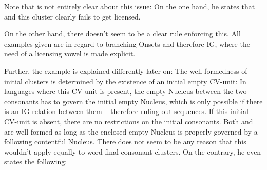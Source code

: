 \ti{*[Sa:kf]}
\begin{structure}
  \wordstart
  \emptyV
  \fen
\end{structure}

Note that \cite{scheer2004} is not entirely clear about this issue:
On the one hand, he states that
and this cluster clearly fails to get licensed.


On the other hand, there doesn't seem to be a clear rule enforcing this.
All examples given are in regard to branching Onsets and therefore \gls{IG},
where the need of a licensing vowel is made explicit.

Further, the  example is explained differently later on:
The well-formedness of initial  clusters is determined by the existence
of an initial empty CV-unit:
In languages where this CV-unit is present, the empty Nucleus between the two consonants
has to govern the initial empty Nucleus, which is only possible if there is
an \gls{IG} relation between them -- therefore ruling out  sequences.
If this initial CV-unit is absent, there are no restrictions on the initial consonants.
Both  and  are well-formed as long as the enclosed empty Nucleus
is properly governed by a following contentful Nucleus.
There does not seem to be any reason that this wouldn't apply equally to word-final
consonant clusters. On the contrary, he even states the following:
